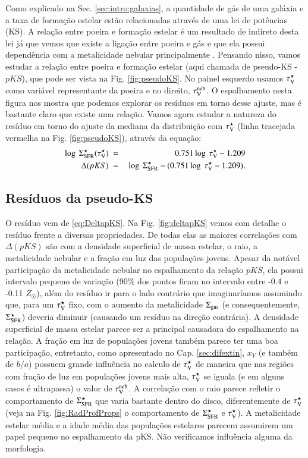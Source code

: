 Como explicado na Sec. \ref{sec:intro:galaxias}, a quantidade de gás de uma galáxia e a taxa de
formação estelar estão relacionadas através de uma lei de potências (KS). A relação entre poeira e
formação estelar é um resultado de indireto desta lei já que vemos que existe a ligação entre poeira
e gás e que ela possui dependência com a metalicidade nebular principalmente \citep[][e suas
referências]{Magdis.etal.2011a, Leroy.etal.2011a, Santini.etal.2014a}. Pensando nisso, vamos estudar
a relação entre poeira e formação estelar (aqui chamada de pseudo-KS - $pKS$), que pode ser vista na
Fig. \ref{fig:pseudoKS}. No painel esquerdo usamos $\tau_{\mathrm{V}}^\star$ como variável representante da poeira e
no direito, $\tau_{\mathrm{V}}^{\mathrm{neb}}$. O espalhamento nesta figura nos mostra que podemos explorar os resíduos em
torno desse ajuste, mas é bastante claro que existe uma relação. Vamos agora estudar a natureza
do resíduo em torno do ajuste da mediana da distribuição com $\tau_{\mathrm{V}}^\star$ (linha tracejada vermelha na
Fig. \ref{fig:pseudoKS}), através da equação:
\begin{eqnarray}
	\log\ \Sigma_{\mathrm{SFR}}^\star(\tau_{\mathrm{V}}^\star)\ &=&\ 0.751 \log\ \tau_{\mathrm{V}}^\star - 1.209 \\
	\label{eq:pKS_1stadj}
	\Delta(pKS)\ &=&\ \log\ \Sigma_{\mathrm{SFR}}^\star - (0.751 \log\ \tau_{\mathrm{V}}^\star - 1.209).
	\label{eq:DeltapKS}
\end{eqnarray}

\subsection{Resíduos da pseudo-KS}
\label{sec:gasfrac:KS:resid}

O resíduo vem de \eqref{eq:DeltapKS}. Na Fig. \ref{fig:deltapKS} vemos com detalhe o resíduo frente
a diversas propriedades. De todas elas as maiores correlações com $\Delta(pKS)$ são com a densidade
superficial de massa estelar, o raio, a metalicidade nebular e a fração em luz das populações
jovens. Apesar da notável participação da metalicidade nebular no espalhamento da relação $pKS$, ela
possui intervalo pequeno de variação (90\% dos pontos ficam no intervalo entre -0.4 e -0.11
$Z_\odot$), além do resíduo ir para o lado contrário que imaginaríamos assumindo que, para um
$\tau_{\mathrm{V}}^\star$ fixo, com o aumento da metalicidade $\Sigma_{\mathrm{gas}}$ (e consequentemente, $\Sigma_{\mathrm{SFR}}^\star$) deveria
diminuir (causando um resíduo na direção contrária). A densidade superficial de massa estelar parece
ser a principal causadora do espalhamento na relação. A fração em luz de populações jovens também
parece ter uma boa participação, entretanto, como apresentado no Cap. \ref{sec:difextin}, $x_Y$ (e
também de $b/a$) possuem grande influência no calculo de $\tau_{\mathrm{V}}^\star$ de maneira que nas regiões com
fração de luz em populações jovens mais alta, $\tau_{\mathrm{V}}^\star$ se iguala (e em alguns casos é ultrapassa) o
valor de $\tau_{\mathrm{V}}^{\mathrm{neb}}$. A correlação com o raio parece refletir o comportamento de $\Sigma_{\mathrm{SFR}}^\star$ que varia
bastante dentro do disco, diferentemente de $\tau_{\mathrm{V}}^\star$ (veja na Fig. \ref{fig:RadProfProps} o
comportamento de $\Sigma_{\mathrm{SFR}}^\star$ e $\tau_{\mathrm{V}}^\star$). A metalicidade estelar média e a idade média das
populações estelares parecem assumirem um papel pequeno no espalhamento da pKS. Não verificamos
influência alguma da morfologia.

